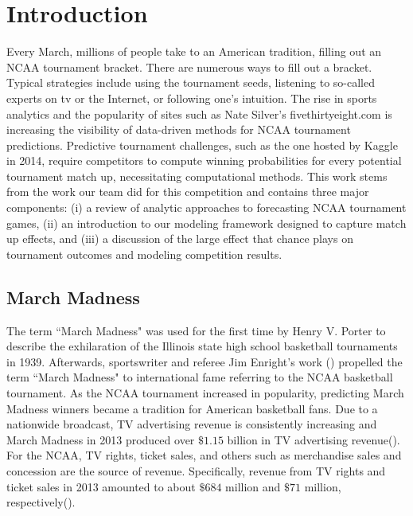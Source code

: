 \section{Introduction}

Every March, millions of people take to an American tradition, filling out an NCAA tournament bracket. There are numerous ways to fill out a bracket. Typical strategies include using the tournament seeds, listening to so-called experts on tv or the Internet, or following one's intuition. The rise in sports analytics and the popularity of sites such as Nate Silver's fivethirtyeight.com is increasing the visibility of data-driven methods for NCAA tournament predictions. Predictive tournament challenges, such as the one hosted by Kaggle in 2014, require competitors to compute winning probabilities for every potential tournament match up, necessitating computational methods. This work stems from the work our team did for this competition and contains three major components: (i) a review of analytic approaches to forecasting NCAA tournament games, (ii) an introduction to our modeling framework designed to capture match up effects, and (iii) a discussion of the large effect that chance plays on tournament outcomes and modeling competition results.


\subsection{March Madness}
The term ``March Madness" was used for the first time by Henry V. Porter to describe the exhilaration of the Illinois state high school basketball tournaments in 1939.  Afterwards, sportswriter and referee Jim Enright's work (\cite{enright1977march}) propelled the term ``March Madness" to international fame referring to the NCAA basketball tournament. As the NCAA  tournament increased in popularity, predicting March Madness winners became a tradition for American basketball fans. Due to a nationwide broadcast, TV advertising revenue is consistently increasing and March Madness in 2013 produced over $\$ 1.15$ billion in TV advertising revenue(\cite{Kantar2014}). For the NCAA, TV rights, ticket sales, and others such as merchandise sales and concession are the source of revenue. Specifically, revenue from TV rights and ticket sales in 2013 amounted to about $\$ 684$ million and $\$ 71$ million, respectively(\cite{NCAA2014}).

